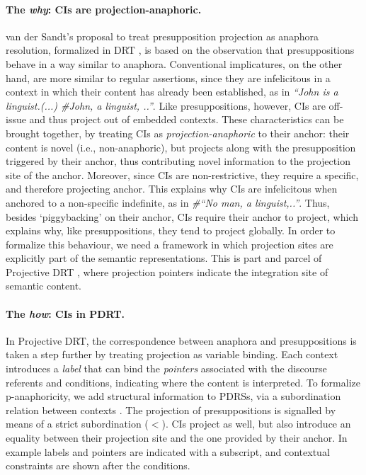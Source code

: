 \documentclass[a4paper,12pt]{article}
\begin{document}
\paragraph{The \emph{why}: CIs are projection-anaphoric.} van der Sandt's
\citep{sandt1992presupposition-short} proposal to treat presupposition
projection as anaphora resolution, formalized in DRT \cite{kamp1981theory-short},
is based on the observation that presuppositions behave in a way similar to
anaphora. Conventional implicatures, on the other hand, are more similar to
regular assertions, since they are infelicitous in a context in which their
content has already been established, as in \emph{``John is a linguist.(...)
\#John, a linguist, ..''}. Like presuppositions, however, CIs are off-issue
and thus project out of embedded contexts. These characteristics can be
brought together, by treating CIs as \emph{projection-anaphoric} to their
anchor: their content is novel (i.e., non-anaphoric), but projects along
with the presupposition triggered by their anchor, thus contributing novel
information to the projection site of the anchor.  Moreover, since CIs are
non-restrictive, they require a specific, and therefore projecting anchor.
This explains why CIs are infelicitous when anchored to a non-specific
indefinite, as in \emph{\#``No man, a linguist,..''}. Thus, besides
`piggybacking' on their anchor, CIs require their anchor to project,
which explains why, like presuppositions, they tend to project globally.
In order to formalize this
behaviour, we need a framework in which projection sites are explicitly part
of the semantic representations.  This is part and parcel of Projective DRT
\cite{venhuizen2013iwcs-short}, where projection pointers indicate
the integration site of semantic content. 

\vspace{-0.4cm} \paragraph{The \emph{how}: CIs in PDRT.} In Projective DRT, the
correspondence between anaphora and presuppositions is taken a step further
by treating projection as variable binding. Each context introduces
a \emph{label} that can bind the \emph{pointers} associated with the
discourse referents and conditions, indicating where the content is
interpreted. To formalize p-anaphoricity, we add structural information to
PDRSs, via a subordination relation between contexts
\citep[cf.][]{reyle1993dealing-short}.
The projection of presuppositions is signalled by means
of a strict subordination ($<$).  CIs project as well, but also
introduce an equality between their projection site and the one
provided by their anchor.  In example \Next labels and
pointers are indicated with a subscript, and contextual constraints are shown
after the conditions. 
\end{document}
